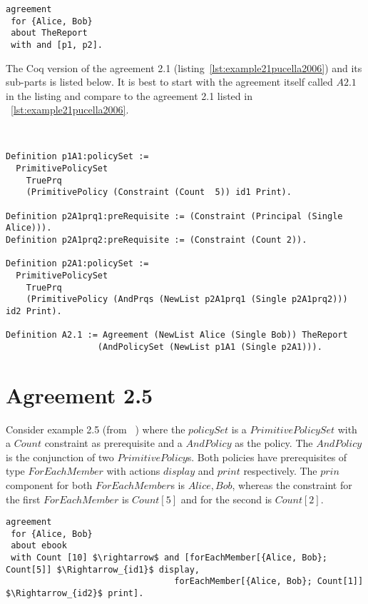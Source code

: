 \lstset{language=Pucella2006}
\begin{lstlisting}[frame=single, caption={Agreement 2.1 (as used in ~\cite{pucella2006})},label={lst:example21pucella2006}]
agreement
 for {Alice, Bob} 
 about TheReport 
 with and [p1, p2].
\end{lstlisting}

The Coq version of the agreement 2.1 (listing~\ref{lst:example21pucella2006}) and its sub-parts is listed below. It is best to start with the agreement itself called $A2.1$ in the listing and compare to the agreement 2.1 listed in ~\ref{lst:example21pucella2006}.

\lstset{language=Coq}
\begin{minipage}[c]{0.95\textwidth}
\begin{lstlisting}[frame=single, caption={Agreement 2.1 in Coq},label={lst:example21}]


Definition p1A1:policySet :=
  PrimitivePolicySet
    TruePrq
    (PrimitivePolicy (Constraint (Count  5)) id1 Print).

Definition p2A1prq1:preRequisite := (Constraint (Principal (Single Alice))).
Definition p2A1prq2:preRequisite := (Constraint (Count 2)).

Definition p2A1:policySet :=
  PrimitivePolicySet
    TruePrq
    (PrimitivePolicy (AndPrqs (NewList p2A1prq1 (Single p2A1prq2))) id2 Print).

Definition A2.1 := Agreement (NewList Alice (Single Bob)) TheReport
                  (AndPolicySet (NewList p1A1 (Single p2A1))).

\end{lstlisting}                  
\end{minipage}

\section{Agreement 2.5}

Consider example 2.5 (from ~\cite{pucella2006}) where the $policySet$ is a $PrimitivePolicySet$ with a $Count$ constraint as prerequisite and a $AndPolicy$ as the policy. The $AndPolicy$ is the conjunction of two $PrimitivePolicy$s. Both policies have prerequisites of type $ForEachMember$ with actions $display$ and $print$ respectively. The $prin$ component for both $ForEachMember$s is ${Alice, Bob}$, whereas the constraint for the first $ForEachMember$ is $Count[5]$ and for the second is $Count[2]$.

\lstset{language=Pucella2006}
\begin{lstlisting}[frame=single, caption={Agreement 2.5 (as used in ~\cite{pucella2006})},label={lst:example25pucella2006}]
agreement
 for {Alice, Bob} 
 about ebook 
 with Count [10] $\rightarrow$ and [forEachMember[{Alice, Bob}; Count[5]] $\Rightarrow_{id1}$ display,
                                 forEachMember[{Alice, Bob}; Count[1]] $\Rightarrow_{id2}$ print].
\end{lstlisting}

